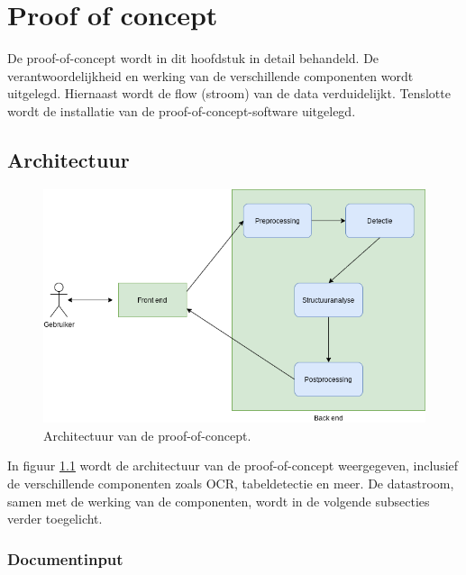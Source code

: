 
\chapter{Proof of concept}
\label{ch:proof-of-concept}

De proof-of-concept wordt in dit hoofdstuk in detail behandeld. De verantwoordelijkheid en werking van de verschillende componenten wordt uitgelegd. Hiernaast wordt de flow (stroom) van de data verduidelijkt. Tenslotte wordt de installatie van de proof-of-concept-software uitgelegd.

\section{Architectuur}
\label{sec:architectuur}

\begin{figure}[H]
    \centering
    \includegraphics[width=1\textwidth]{img/proof_of_concept_architectuur.png}
    \caption{Architectuur van de proof-of-concept.}
    \label{fig:architectuur-proof-of-concept}
\end{figure}

In figuur \ref{fig:architectuur-proof-of-concept} wordt de architectuur van de proof-of-concept weergegeven, inclusief de verschillende componenten zoals \Gls{OCR}, tabeldetectie en meer. De datastroom, samen met de werking van de componenten, wordt in de volgende subsecties verder toegelicht.

\subsection{Documentinput}
\label{subsec:document-input}


